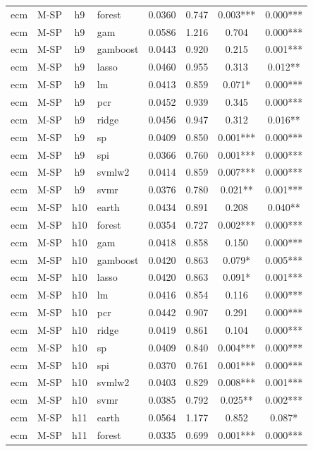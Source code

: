 \begin{ThreePartTable}
\begin{longtable}[t]{llclcccc}
ecm & M-SP & h9 & forest & 0.0360 & 0.747 & 0.003*** & 0.000***\\
ecm & M-SP & h9 & gam & 0.0586 & 1.216 & 0.704 & 0.000***\\
ecm & M-SP & h9 & gamboost & 0.0443 & 0.920 & 0.215 & 0.001***\\
ecm & M-SP & h9 & lasso & 0.0460 & 0.955 & 0.313 & 0.012**\\
ecm & M-SP & h9 & lm & 0.0413 & 0.859 & 0.071* & 0.000***\\
ecm & M-SP & h9 & pcr & 0.0452 & 0.939 & 0.345 & 0.000***\\
ecm & M-SP & h9 & ridge & 0.0456 & 0.947 & 0.312 & 0.016**\\
ecm & M-SP & h9 & sp & 0.0409 & 0.850 & 0.001*** & 0.000***\\
ecm & M-SP & h9 & spi & 0.0366 & 0.760 & 0.001*** & 0.000***\\
ecm & M-SP & h9 & svmlw2 & 0.0414 & 0.859 & 0.007*** & 0.000***\\
ecm & M-SP & h9 & svmr & 0.0376 & 0.780 & 0.021** & 0.001***\\
\addlinespace
ecm & M-SP & h10 & earth & 0.0434 & 0.891 & 0.208 & 0.040**\\
ecm & M-SP & h10 & forest & 0.0354 & 0.727 & 0.002*** & 0.000***\\
ecm & M-SP & h10 & gam & 0.0418 & 0.858 & 0.150 & 0.000***\\
ecm & M-SP & h10 & gamboost & 0.0420 & 0.863 & 0.079* & 0.005***\\
ecm & M-SP & h10 & lasso & 0.0420 & 0.863 & 0.091* & 0.001***\\
ecm & M-SP & h10 & lm & 0.0416 & 0.854 & 0.116 & 0.000***\\
ecm & M-SP & h10 & pcr & 0.0442 & 0.907 & 0.291 & 0.000***\\
ecm & M-SP & h10 & ridge & 0.0419 & 0.861 & 0.104 & 0.000***\\
ecm & M-SP & h10 & sp & 0.0409 & 0.840 & 0.004*** & 0.000***\\
ecm & M-SP & h10 & spi & 0.0370 & 0.761 & 0.001*** & 0.000***\\
ecm & M-SP & h10 & svmlw2 & 0.0403 & 0.829 & 0.008*** & 0.001***\\
ecm & M-SP & h10 & svmr & 0.0385 & 0.792 & 0.025** & 0.002***\\
\addlinespace
ecm & M-SP & h11 & earth & 0.0564 & 1.177 & 0.852 & 0.087*\\
ecm & M-SP & h11 & forest & 0.0335 & 0.699 & 0.001*** & 0.000***\\

\end{longtable}
\end{ThreePartTable}
